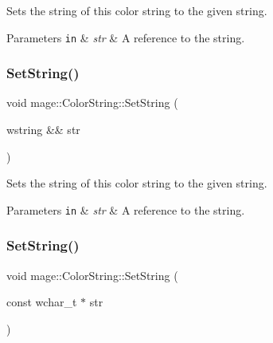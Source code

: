 Sets the string of this color string to the given string.


\begin{DoxyParams}[1]{Parameters}
\mbox{\tt in}  & {\em str} & A reference to the string. \\
\hline
\end{DoxyParams}
\hypertarget{structmage_1_1_color_string_a62a374668fafc55281b97e6374027b25}{}\label{structmage_1_1_color_string_a62a374668fafc55281b97e6374027b25} 
\subsubsection{\texorpdfstring{Set\+String()}{SetString()}\hspace{0.1cm}{\footnotesize\ttfamily [2/3]}}
{\footnotesize\ttfamily void mage\+::\+Color\+String\+::\+Set\+String (\begin{DoxyParamCaption}\item[{wstring \&\&}]{str }\end{DoxyParamCaption})\hspace{0.3cm}{\ttfamily [noexcept]}}

Sets the string of this color string to the given string.


\begin{DoxyParams}[1]{Parameters}
\mbox{\tt in}  & {\em str} & A reference to the string. \\
\hline
\end{DoxyParams}
\hypertarget{structmage_1_1_color_string_a317caadad725b67ede68f1e474e47d3b}{}\label{structmage_1_1_color_string_a317caadad725b67ede68f1e474e47d3b} 
\subsubsection{\texorpdfstring{Set\+String()}{SetString()}\hspace{0.1cm}{\footnotesize\ttfamily [3/3]}}
{\footnotesize\ttfamily void mage\+::\+Color\+String\+::\+Set\+String (\begin{DoxyParamCaption}\item[{const wchar\+\_\+t $\ast$}]{str }\end{DoxyParamCaption})}

